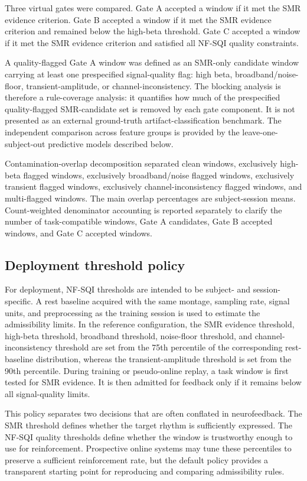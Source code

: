 \documentclass[preprint,12pt]{elsarticle}
\begin{document}
Three virtual gates were compared. Gate A accepted a window if it met the SMR evidence criterion. Gate B accepted a window if it met the SMR evidence criterion and remained below the high-beta threshold. Gate C accepted a window if it met the SMR evidence criterion and satisfied all NF-SQI quality constraints.

A quality-flagged Gate A window was defined as an SMR-only candidate window carrying at least one prespecified signal-quality flag: high beta, broadband/noise-floor, transient-amplitude, or channel-inconsistency. The blocking analysis is therefore a rule-coverage analysis: it quantifies how much of the prespecified quality-flagged SMR-candidate set is removed by each gate component. It is not presented as an external ground-truth artifact-classification benchmark. The independent comparison across feature groups is provided by the leave-one-subject-out predictive models described below.

Contamination-overlap decomposition separated clean windows, exclusively high-beta flagged windows, exclusively broadband/noise flagged windows, exclusively transient flagged windows, exclusively channel-inconsistency flagged windows, and multi-flagged windows. The main overlap percentages are subject-session means. Count-weighted denominator accounting is reported separately to clarify the number of task-compatible windows, Gate A candidates, Gate B accepted windows, and Gate C accepted windows.

\subsection{Deployment threshold policy}

For deployment, NF-SQI thresholds are intended to be subject- and session-specific. A rest baseline acquired with the same montage, sampling rate, signal units, and preprocessing as the training session is used to estimate the admissibility limits. In the reference configuration, the SMR evidence threshold, high-beta threshold, broadband threshold, noise-floor threshold, and channel-inconsistency threshold are set from the 75th percentile of the corresponding rest-baseline distribution, whereas the transient-amplitude threshold is set from the 90th percentile. During training or pseudo-online replay, a task window is first tested for SMR evidence. It is then admitted for feedback only if it remains below all signal-quality limits.

This policy separates two decisions that are often conflated in neurofeedback. The SMR threshold defines whether the target rhythm is sufficiently expressed. The NF-SQI quality thresholds define whether the window is trustworthy enough to use for reinforcement. Prospective online systems may tune these percentiles to preserve a sufficient reinforcement rate, but the default policy provides a transparent starting point for reproducing and comparing admissibility rules.
\end{document}
